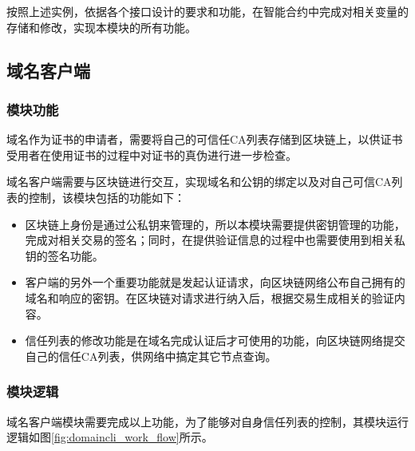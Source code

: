 按照上述实例，依据各个接口设计的要求和功能，在智能合约中完成对相关变量的存储和修改，实现本模块的所有功能。




\subsection{域名客户端}

\subsubsection{模块功能}

域名作为证书的申请者，需要将自己的可信任CA列表存储到区块链上，以供证书受用者在使用证书的过程中对证书的真伪进行进一步检查。

域名客户端需要与区块链进行交互，实现域名和公钥的绑定以及对自己可信CA列表的控制，该模块包括的功能如下：

\begin{itemize}
	\item 
	\noindent{}

	区块链上身份是通过公私钥来管理的，所以本模块需要提供密钥管理的功能，完成对相关交易的签名；同时，在提供验证信息的过程中也需要使用到相关私钥的签名功能。

	\item 
	\noindent{}

	客户端的另外一个重要功能就是发起认证请求，向区块链网络公布自己拥有的域名和响应的密钥。在区块链对请求进行纳入后，根据交易生成相关的验证内容。

	\item
	\noindent{}

	信任列表的修改功能是在域名完成认证后才可使用的功能，向区块链网络提交自己的信任CA列表，供网络中搞定其它节点查询。

\end{itemize}

\subsubsection{模块逻辑}

域名客户端模块需要完成以上功能，为了能够对自身信任列表的控制，其模块运行逻辑如图\ref{fig:domaincli_work_flow}所示。

